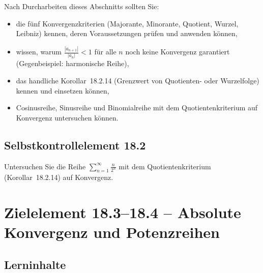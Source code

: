 \documentclass[a4paper,12pt]{article}
\begin{document}
Nach Durcharbeiten dieses Abschnitts sollten Sie:
\begin{itemize}
  \item die fünf Konvergenzkriterien (Majorante, Minorante, Quotient, Wurzel,
        Leibniz) kennen, deren Voraussetzungen prüfen und anwenden können,
  \item wissen, warum $\frac{|a_{n+1}|}{|a_n|} < 1$ für alle $n$ noch keine
        Konvergenz garantiert (Gegenbeispiel: harmonische Reihe),
  \item das handliche Korollar~18.2.14 (Grenzwert von Quotienten- oder
        Wurzelfolge) kennen und einsetzen können,
  \item Cosinusreihe, Sinusreihe und Binomialreihe mit dem Quotientenkriterium auf
        Konvergenz untersuchen können.
\end{itemize}

\subsection*{Selbstkontrollelement 18.2}

Untersuchen Sie die Reihe $\displaystyle\sum_{n=1}^{\infty} \frac{n}{2^n}$ mit dem
Quotientenkriterium (Korollar~18.2.14) auf Konvergenz.

\newpage

\section*{Zielelement 18.3--18.4 -- Absolute Konvergenz und Potenzreihen}

\subsection*{Lerninhalte}

\begin{center}
\end{center}
\end{document}
